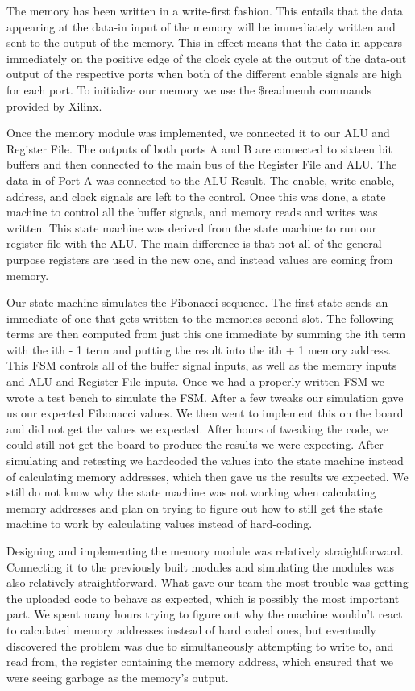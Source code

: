 \documentclass[onecolumn, 12pt]{IEEEtran}
\begin{document}
\par
	The memory has been written in a write-first fashion. This entails that the data appearing at the data-in input of the memory will be immediately written and sent to the output of the memory. This in effect means that the data-in appears immediately on the positive edge of the clock cycle at the output of the data-out output of the respective ports when both of the different enable signals are high for each port. To initialize our memory we use the \$readmemh commands provided by Xilinx.
\par
	Once the memory module was implemented, we connected it to our ALU and Register File. The outputs of both ports A and B are connected to sixteen bit buffers and then connected to the main bus of the Register File and ALU. The data in of Port A was connected to the ALU Result. The enable, write enable, address, and clock signals are left to the control. Once this was done, a state machine to control all the buffer signals, and memory reads and writes was written. This state machine was derived from the state machine to run our register file with the ALU. The main difference is that not all of the general purpose registers are used in the new one, and instead values are coming from memory.
\par
	Our state machine simulates the Fibonacci sequence. The first state sends an immediate of one that gets written to the memories second slot. The following terms are then computed from just this one immediate by summing the ith  term with the ith  - 1 term and putting the result into the ith  + 1 memory address. This FSM controls all of the buffer signal inputs, as well as the memory inputs and ALU and Register File inputs. Once we had a properly written FSM we wrote a test bench to simulate the FSM. After a few tweaks our simulation gave us our expected Fibonacci values. We then went to implement this on the board and did not get the values we expected. After hours of tweaking the code, we could still not get the board to produce the results we were expecting. After simulating and retesting we hardcoded the values into the state machine instead of calculating memory addresses, which then gave us the results we expected. We still do not know why the state machine was not working when calculating memory addresses and plan on trying to figure out how to still get the state machine to work by calculating values instead of hard-coding.
\par
	Designing and implementing the memory module was relatively straightforward. Connecting it to the previously built modules and simulating the modules was also relatively straightforward. What gave our team the most trouble was getting the uploaded code to behave as expected, which is possibly the most important part. We spent many hours trying to figure out why the machine wouldn't react to calculated memory addresses instead of hard coded ones, but eventually discovered the problem was due to simultaneously attempting to write to, and read from, the register containing the memory address, which ensured that we were seeing garbage as the memory's output.
\end{document}
